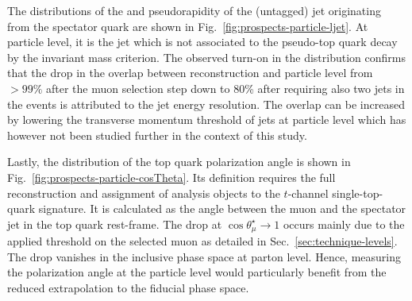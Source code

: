 The distributions of the \pt and pseudorapidity of the (untagged) jet originating from the spectator quark are shown in Fig.~\ref{fig:prospects-particle-ljet}. 
At particle level, it is the jet which is not associated to the pseudo-top quark decay by the invariant mass criterion. 
The observed turn-on in the \pt distribution confirms that the drop in the overlap between reconstruction and particle level from $>99\%$ after the muon selection step down to 80\% after requiring also two jets in the events is attributed to the jet energy resolution. The overlap can be increased by lowering the transverse momentum threshold of jets at particle level which has however not been studied further in the context of this study.


Lastly, the distribution of the top quark polarization angle is shown in Fig.~\ref{fig:prospects-particle-cosTheta}. Its definition requires the full reconstruction and assignment of analysis objects to the $t$-channel single-top-quark signature. It is calculated as the angle between the muon and the spectator jet in the top quark rest-frame. 
The drop at $\cos\theta_\mu^\star\to1$ occurs mainly due to the applied \pt threshold on the selected muon as detailed in Sec.~\ref{sec:technique-levels}. The drop vanishes in the inclusive phase space at parton level. Hence, measuring the polarization angle at the particle level would particularly benefit from the reduced extrapolation to the fiducial phase space.

